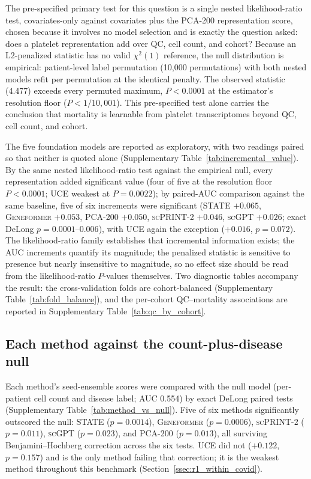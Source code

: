 \documentclass[11pt,a4paper]{article}
\newcommand{\model}[1]{\textsc{#1}}
\begin{document}
The pre-specified primary test for this question is a single nested
likelihood-ratio test, covariates-only against covariates plus the PCA-200
representation score, chosen because it involves no model selection and is
exactly the question asked: does a platelet representation add over QC, cell
count, and cohort? Because an L2-penalized statistic has no valid $\chi^2(1)$
reference, the null distribution is empirical: patient-level label
permutation (10{,}000 permutations) with both nested models refit per
permutation at the identical penalty. The observed statistic (4.477) exceeds
every permuted maximum, $P < 0.0001$ at the estimator's resolution floor
($P < 1/10{,}001$). This pre-specified test alone carries the conclusion that
mortality is learnable from platelet transcriptomes beyond QC, cell count,
and cohort.

The five foundation models are reported as exploratory, with two readings
paired so that neither is quoted alone (Supplementary
Table~\ref{tab:incremental_value}). By the same nested likelihood-ratio test
against the empirical null, every representation added significant value
(four of five at the resolution floor $P < 0.0001$; \model{UCE} weakest at
$P = 0.0022$); by paired-AUC comparison against the same baseline, five of
six increments were significant (\model{STATE} $+0.065$, \model{Geneformer}
$+0.053$, PCA-200 $+0.050$, \model{scPRINT-2} $+0.046$, \model{scGPT}
$+0.026$; exact DeLong $p = 0.0001$--$0.006$), with \model{UCE} again the
exception ($+0.016$, $p = 0.072$). The likelihood-ratio family establishes
that incremental information exists; the AUC increments quantify its
magnitude; the penalized statistic is sensitive to presence but nearly
insensitive to magnitude, so no effect size should be read from the
likelihood-ratio $P$-values themselves. Two diagnostic tables accompany the
result: the cross-validation folds are cohort-balanced (Supplementary
Table~\ref{tab:fold_balance}), and the per-cohort QC--mortality associations
are reported in Supplementary Table~\ref{tab:qc_by_cohort}.

\subsection{Each method against the count-plus-disease null}
\label{sn:method_vs_null}

Each method's seed-ensemble scores were compared with the null model
(per-patient cell count and disease label; AUC 0.554) by exact DeLong paired
tests (Supplementary Table~\ref{tab:method_vs_null}). Five of six methods
significantly outscored the null: \model{STATE}
($p = 0.0014$), \model{Geneformer} ($p = 0.0006$), \model{scPRINT-2}
($p = 0.011$), \model{scGPT} ($p = 0.023$), and PCA-200 ($p = 0.013$), all
surviving Benjamini--Hochberg correction across the six tests. \model{UCE}
did not ($+0.122$, $p = 0.157$) and is the only method failing that
correction; it is the weakest method throughout this benchmark
(Section~\ref{ssec:r1_within_covid}).
\end{document}
